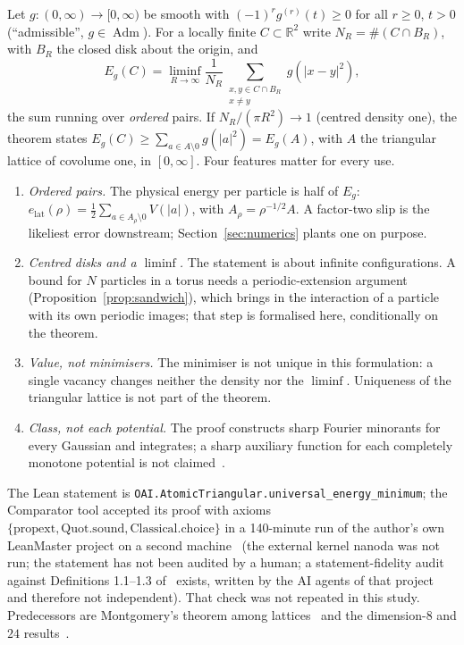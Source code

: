 \documentclass[11pt,a4paper]{article}
\newcommand{\elat}{e_{\mathrm{lat}}}
\DeclareMathOperator{\Adm}{Adm}
\begin{document}
Let $g\colon(0,\infty)\to[0,\infty)$ be smooth with $(-1)^r g^{(r)}(t)\ge0$ for all $r\ge0$, $t>0$ (``admissible'', $g\in\Adm$). For a
locally finite $C\subset\mathbb R^2$ write $N_R=\#(C\cap B_R)$, with $B_R$ the closed disk about the origin, and
\begin{equation}
E_g(C)=\liminf_{R\to\infty}\frac1{N_R}\sum_{\substack{x,y\in C\cap B_R\\ x\ne y}} g(|x-y|^2),
\end{equation}
the sum running over \emph{ordered} pairs. If $N_R/(\pi R^2)\to1$ (centred density one), the theorem states
$E_g(C)\ge\sum_{a\in A\setminus 0}g(|a|^2)=E_g(A)$, with $A$ the triangular lattice of covolume one, in $[0,\infty]$.
Four features matter for every use.
\begin{enumerate}[nosep]
\item \emph{Ordered pairs.} The physical energy per particle is half of $E_g$: $\elat(\rho)=\tfrac12\sum_{a\in A_\rho\setminus0}V(|a|)$,
with $A_\rho=\rho^{-1/2}A$. A factor-two slip is the likeliest error downstream; Section~\ref{sec:numerics} plants one on purpose.
\item \emph{Centred disks and a $\liminf$.} The statement is about infinite configurations. A bound for $N$ particles in a
torus needs a periodic-extension argument (Proposition~\ref{prop:sandwich}), which brings in the interaction of a particle with its own
periodic images; that step is formalised here, conditionally on the theorem.
\item \emph{Value, not minimisers.} The minimiser is not unique in this formulation: a single vacancy changes neither the density nor the
$\liminf$. Uniqueness of the triangular lattice is not part of the theorem.
\item \emph{Class, not each potential.} The proof constructs sharp Fourier minorants for every Gaussian and integrates; a sharp auxiliary
function for each completely monotone potential is not claimed~\cite{OpenAI2026}.
\end{enumerate}
The Lean statement is \texttt{OAI.AtomicTriangular.universal\_energy\_minimum}; the Comparator tool accepted its proof with
axioms $\{\text{propext},\text{Quot.sound},\text{Classical.choice}\}$ in a 140-minute run of the author's own LeanMaster project on a second
machine~\cite{LeanMaster2026} (the external kernel nanoda was not run; the statement has not been audited by a human; a
statement-fidelity audit against Definitions 1.1--1.3 of~\cite{CKMRV2022} exists, written by the AI agents of that project and therefore
not independent). That check was not repeated in this study. Predecessors are Montgomery's theorem among lattices~\cite{Montgomery1988} and the dimension-$8$ and
$24$ results~\cite{CKMRV2022}.
\end{document}
